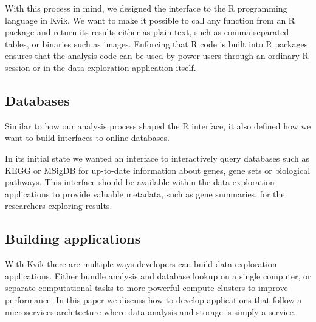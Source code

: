 With this process in mind, we designed the interface to the R programming
language in Kvik. We want to make it possible to call any function from an R
package and return its results either as plain text, such as comma-separated
tables, or binaries such as images. Enforcing that R code is built into R
packages ensures that the analysis code can be used by power users through an
ordinary R session or in the data exploration application itself. 

\subsection*{Databases} 

Similar to how our analysis process shaped the R interface, it also defined how
we want to build interfaces to online databases. 


In its initial state we wanted an interface to interactively query databases
such as KEGG or MSigDB for up-to-date information about genes, gene sets or
biological pathways. This interface should be available within the data
exploration applications to provide valuable metadata, such as gene summaries,
for the researchers exploring results.  




\subsection*{Building applications} 

With Kvik there are multiple ways developers can build data
exploration applications. Either bundle analysis and database lookup on a single
computer, or separate computational tasks to more powerful compute clusters to
improve performance. 
In this paper we discuss how to develop applications that follow a
microservices architecture where data analysis and storage is simply a service. 

